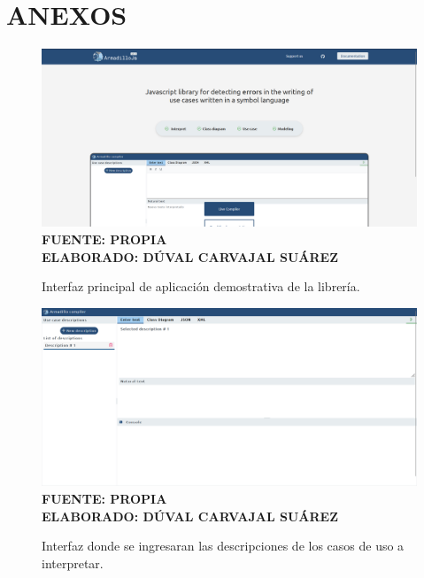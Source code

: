 \setcounter{chapter}{6}
\setcounter{section}{0}
\part{ANEXOS}

\begin{figure}[H]
	\caption{Interfaz principal de aplicación demostrativa de la librería.}
	\includegraphics[width=15cm]{img/anexo1.png}
	\label{fig:anexo1}
	\textbf{\\ FUENTE: PROPIA \\ ELABORADO: DÚVAL CARVAJAL SUÁREZ}
\end{figure} 

\begin{figure}[H]
	\caption{Interfaz donde se ingresaran las descripciones de los casos de uso a interpretar.}
	\includegraphics[width=15cm]{img/anexo2.png}
	\label{fig:anexo2}
	\textbf{\\ FUENTE: PROPIA \\ ELABORADO: DÚVAL CARVAJAL SUÁREZ}
\end{figure} 

